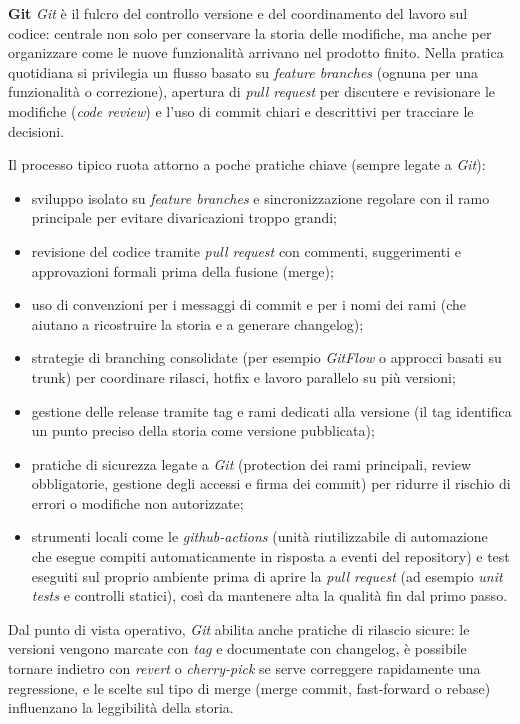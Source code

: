 \medskip
\noindent\textbf{Git}
\emph{Git} è il fulcro del controllo versione e del coordinamento del lavoro sul codice: 
centrale non solo per conservare la storia delle modifiche, ma anche per organizzare come le nuove funzionalità arrivano nel prodotto finito. 
Nella pratica quotidiana si privilegia un flusso basato su \emph{feature branches} (ognuna per una funzionalità o correzione), 
apertura di \emph{pull request} per discutere e revisionare le modifiche (\emph{code review}) e l’uso di commit chiari e descrittivi per tracciare le decisioni.

Il processo tipico ruota attorno a poche pratiche chiave (sempre legate a \emph{Git}):
\begin{itemize}
\item sviluppo isolato su \emph{feature branches} e sincronizzazione regolare con il ramo principale per evitare divaricazioni troppo grandi;
\item revisione del codice tramite \emph{pull request} con commenti, suggerimenti e approvazioni formali prima della fusione (merge);
\item uso di convenzioni per i messaggi di commit e per i nomi dei rami (che aiutano a ricostruire la storia e a generare changelog);
\item strategie di branching consolidate (per esempio \emph{GitFlow} o approcci basati su trunk) per coordinare rilasci, hotfix e lavoro parallelo su più versioni;
\item gestione delle release tramite tag e rami dedicati alla versione (il tag identifica un punto preciso della storia come versione pubblicata);
\item pratiche di sicurezza legate a \emph{Git} (protection dei rami principali, review obbligatorie, gestione degli accessi e firma dei commit) per ridurre il rischio di errori o modifiche non autorizzate;
\item strumenti locali come le \emph{github-actions} (unità riutilizzabile di automazione che esegue compiti automaticamente in risposta a eventi del repository) e test eseguiti sul proprio ambiente prima di aprire la \emph{pull request} (ad esempio \emph{unit tests} e controlli statici), così da mantenere alta la qualità fin dal primo passo.
\end{itemize}

Dal punto di vista operativo, \emph{Git} abilita anche pratiche di rilascio sicure: le versioni vengono marcate con \emph{tag} e documentate con changelog, è possibile tornare indietro con \emph{revert} o \emph{cherry-pick} se serve correggere rapidamente una regressione, e le scelte sul tipo di merge (merge commit, fast-forward o rebase) influenzano la leggibilità della storia.

